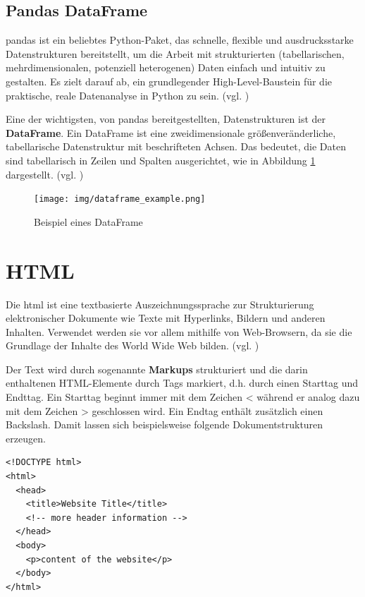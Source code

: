 \documentclass[oneside]{ausarbeitung}
\begin{document}
\subsection{Pandas DataFrame}
\label{sub:dataframe}

\ac{pandas} ist ein beliebtes Python-Paket, das schnelle, flexible und ausdrucksstarke Datenstrukturen bereitstellt, um die Arbeit mit strukturierten (tabellarischen, mehrdimensionalen, potenziell heterogenen) Daten einfach und intuitiv zu gestalten. Es zielt darauf ab, ein grundlegender High-Level-Baustein für die praktische, reale Datenanalyse in Python zu sein. (vgl. \cite{pandas_definition})

Eine der wichtigsten, von pandas bereitgestellten, Datenstrukturen ist der \textbf{DataFrame}. Ein DataFrame ist eine zweidimensionale größenveränderliche, tabellarische Datenstruktur mit beschrifteten Achsen. Das bedeutet, die Daten sind tabellarisch in Zeilen und Spalten ausgerichtet, wie in Abbildung \ref{fig:8} dargestellt. (vgl. \cite{dataframe_example})

\begin{figure}[H]
  \centering
  \texttt{[image: img/dataframe\_example.png]}
  \caption{Beispiel eines DataFrame\cite{dataframe_example}}
  \label{fig:8}
\end{figure}


\section{HTML}
\label{sec:html}

Die \ac{html} ist eine textbasierte Auszeichnungssprache zur Strukturierung elektronischer Dokumente wie Texte mit Hyperlinks, Bildern und anderen Inhalten. Verwendet werden sie vor allem mithilfe von Web-Browsern, da sie die Grundlage der Inhalte des World Wide Web bilden. (vgl. \cite{html})

Der Text wird durch sogenannte \textbf{Markups} strukturiert und die darin enthaltenen HTML-Elemente durch Tags markiert, d.h. durch einen Starttag und Endttag. Ein Starttag beginnt immer mit dem Zeichen < während er analog dazu mit dem Zeichen > geschlossen wird. Ein Endtag enthält zusätzlich einen Backslash. Damit lassen sich beispielsweise folgende Dokumentstrukturen erzeugen. \\

\lstset{language=HTML}
\lstset{frame=lines}
\lstset{basicstyle=\footnotesize}
\begin{lstlisting}
<!DOCTYPE html>
<html>
  <head>
    <title>Website Title</title>
    <!-- more header information -->
  </head>
  <body>
    <p>content of the website</p>
  </body>
</html>
\end{lstlisting}
\end{document}
